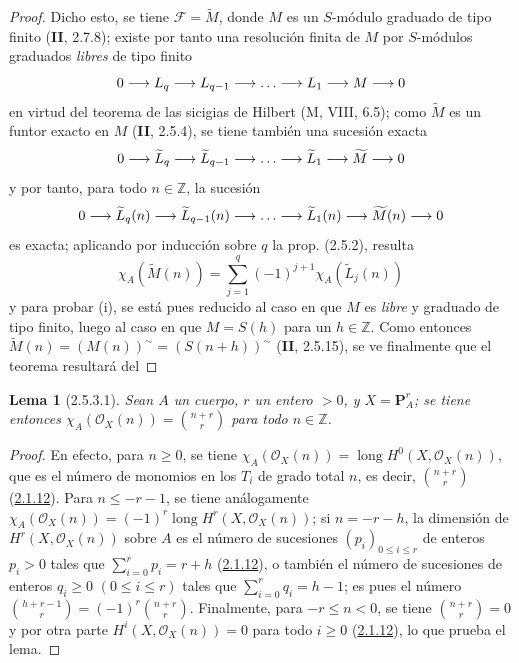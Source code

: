 \documentclass[10pt,oneside,openany]{book}
\theoremstyle{egaenv}\newtheorem*{env}{---}
\theoremstyle{egastatement}
\newtheorem*{lemma}{Lema}
\theoremstyle{egadescription}
\newcommand{\oldpage}[2][]{\marginnote{\normalfont\scriptsize\textbf{#1}\,|\,#2}\ignorespaces}
\renewcommand{\leq}{\leqslant}
\renewcommand{\geq}{\geqslant}
\renewcommand{\to}{\mathchoice{\longrightarrow}{\rightarrow}{\rightarrow}{\rightarrow}}
\begin{document}
\begin{proof}
Dicho esto, se tiene $\mathcal F=\widetilde M$, donde $M$ es un $S$-módulo
graduado de tipo finito (\textbf{II}, 2.7.8); existe por tanto una resolución finita
de $M$ por $S$-módulos graduados \emph{libres} de tipo finito
\[
0\to L_q\to L_{q-1}\to\ldots\to L_1\to M\to0
\]
en virtud del teorema de las sicigias de Hilbert (M, VIII, 6.5); como
$\widetilde M$ es un funtor exacto en $M$ (\textbf{II}, 2.5.4), se tiene
también una sucesión exacta
\[
0\to\widetilde L_q\to\widetilde L_{q-1}\to\ldots
\to\widetilde L_1\to\widetilde M\to0
\]
y por tanto, para todo $n\in\mathbb Z$, la sucesión
\[
0\to\widetilde L_q(n)\to\widetilde L_{q-1}(n)\to\ldots
\to\widetilde L_1(n)\to\widetilde M(n)\to0
\]
es exacta; aplicando por inducción sobre $q$ la prop. (2.5.2), resulta
\[
\chi_A(\widetilde M(n))=\sum_{j=1}^{q}(-1)^{j+1}
\chi_A(\widetilde L_j(n))
\]
y para probar (i), se está pues reducido al caso en que $M$ es \emph{libre} y graduado
de tipo finito, luego al caso en que $M=S(h)$ para un $h\in\mathbb Z$. Como
entonces $\widetilde M(n)=(M(n))^\sim=(S(n+h))^\sim$ (\textbf{II}, 2.5.15), se ve
finalmente que el teorema resultará del
\end{proof}

\oldpage[III]{111}
\begin{lemma}[2.5.3.1]
\label{III.2.5.3.1-fr}
Sean $A$ un cuerpo, $r$ un entero $>0$, y $X=\mathbf P_A^r$; se tiene
entonces
$\chi_A(\mathcal O_X(n))=\binom{n+r}{r}$
para todo $n\in\mathbb Z$.
\end{lemma}

\begin{proof}
En efecto, para $n\geq0$, se tiene
$\chi_A(\mathcal O_X(n))=\operatorname{long}H^0(X,\mathcal O_X(n))$, que
es el número de monomios en los $T_i$ de grado total $n$, es decir,
$\binom{n+r}{r}$ (\hyperref[III.2.1.12-fr]{2.1.12}). Para
$n\leq-r-1$, se tiene análogamente
$\chi_A(\mathcal O_X(n))=(-1)^r
\operatorname{long}H^r(X,\mathcal O_X(n))$;
si $n=-r-h$, la dimensión de $H^r(X,\mathcal O_X(n))$ sobre $A$ es el
número de sucesiones $(p_i)_{0\leq i\leq r}$ de enteros $p_i>0$ tales que
$\sum_{i=0}^{r}p_i=r+h$ (\hyperref[III.2.1.12-fr]{2.1.12}), o también el
número de sucesiones de enteros $q_i\geq0$ $(0\leq i\leq r)$ tales que
$\sum_{i=0}^{r}q_i=h-1$; es pues el número
$\binom{h+r-1}{r}=(-1)^r\binom{n+r}{r}$.
Finalmente, para $-r\leq n<0$, se tiene $\binom{n+r}{r}=0$ y por otra parte
$H^i(X,\mathcal O_X(n))=0$ para todo $i\geq0$
(\hyperref[III.2.1.12-fr]{2.1.12}), lo que prueba el lema.
\end{proof}
\end{document}
